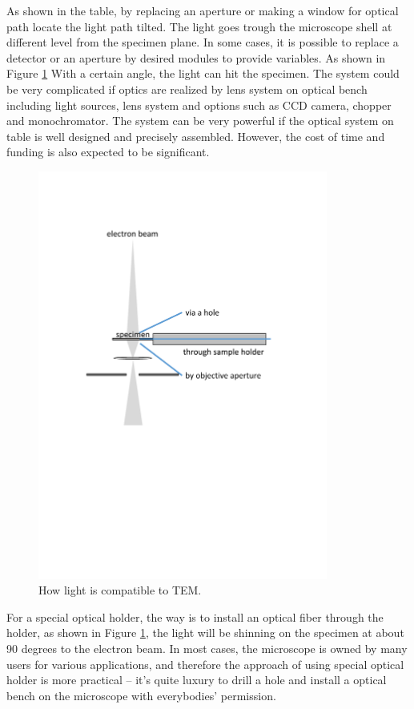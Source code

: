 As shown in the table, by replacing an aperture or making a window for optical path locate the light path tilted. The light goes trough the microscope shell at different level from the specimen plane. In some cases, it is possible to replace a detector or an aperture by desired modules to provide variables. As shown in Figure \ref{fig:2_1} With a certain angle, the light can hit the specimen. The system could be very complicated if optics are realized by lens system on optical bench including light sources, lens system and options such as CCD camera, chopper and monochromator. The system can be very powerful if the optical system on table is well designed and precisely assembled. However, the cost of time and funding is also expected to be significant. \\

\begin{figure}  
\centering
\includegraphics[width=270pt]{figures/figure2_1}
\caption[To put light into TEM.]{How light is compatible to TEM.
\label{fig:2_1}}
\end{figure}

For a special optical holder, the way is to install an optical fiber through the holder, as shown in Figure \ref{fig:2_1}, the light will be shinning on the specimen at about 90 degrees to the electron beam. In most cases, the microscope is owned by many users for various applications, and therefore the approach of using special optical holder is more practical -- it's quite luxury to drill a hole and install a optical bench on the microscope with everybodies' permission. 

